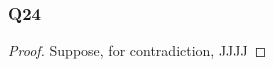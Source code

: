 \documentclass[10pt, leqno21]{article}
\theoremstyle{plain}
\theoremstyle{definition}
\theoremstyle{remark}
\theoremstyle{definition}
\begin{document}
\subsubsection*{Q24}
\begin{proof}
  Suppose, for contradiction, JJJJ
\end{proof}
\end{document}
